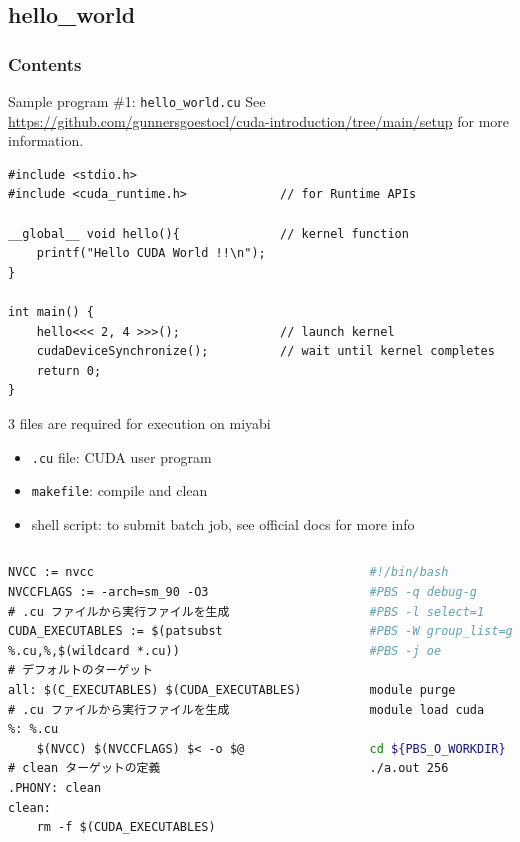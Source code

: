 \documentclass[dvipdfmx, 11pt, aspectratio=169]{beamer}   %
\begin{document}
\subsection{hello\_world}
\begin{frame}
    \frametitle{Contents}
    \linespread{0.6}\selectfont
\end{frame}
\begin{frame}[fragile]{Sample program \#1: \texttt{hello\_world.cu}}
  See \url{https://github.com/gunnersgoestocl/cuda-introduction/tree/main/setup} for more information.
\begin{block}{}
  \begin{lstlisting}[language=CUDA]
#include <stdio.h>
#include <cuda_runtime.h>             // for Runtime APIs

__global__ void hello(){              // kernel function
    printf("Hello CUDA World !!\n");
}

int main() {
    hello<<< 2, 4 >>>();              // launch kernel
    cudaDeviceSynchronize();          // wait until kernel completes
    return 0;
}
  \end{lstlisting}
\end{block}
\end{frame}
\begin{frame}[fragile]{3 files are required for execution on miyabi}
  \begin{itemize}
    \item \lstinline|.cu| file: CUDA user program
    \item \lstinline|makefile|: compile and clean
    \item shell script: to submit batch job, see official docs for more info
  \end{itemize}
  \begin{columns}
    \begin{lstlisting}[style=makefilestyle, basicstyle=\ttfamily\tiny]
NVCC := nvcc
NVCCFLAGS := -arch=sm_90 -O3
# .cu ファイルから実行ファイルを生成
CUDA_EXECUTABLES := $(patsubst %.cu,%,$(wildcard *.cu))
# デフォルトのターゲット
all: $(C_EXECUTABLES) $(CUDA_EXECUTABLES)
# .cu ファイルから実行ファイルを生成
%: %.cu
	$(NVCC) $(NVCCFLAGS) $< -o $@
# clean ターゲットの定義
.PHONY: clean
clean:
	rm -f $(CUDA_EXECUTABLES)
\end{lstlisting}
    \begin{lstlisting}[language=sh]
#!/bin/bash
#PBS -q debug-g
#PBS -l select=1
#PBS -W group_list=gc64
#PBS -j oe

module purge
module load cuda

cd ${PBS_O_WORKDIR}
./a.out 256
\end{lstlisting}
  \end{columns}
\end{frame}
\end{document}
